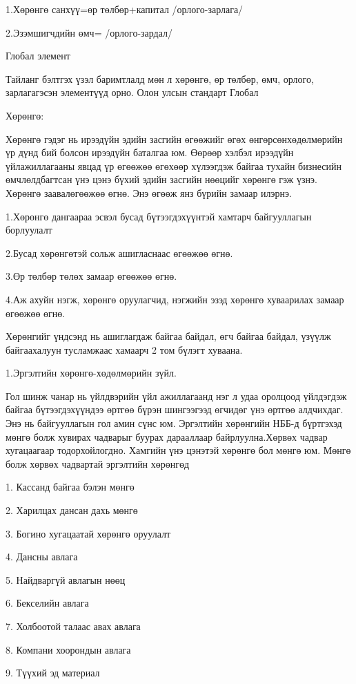 {{{{{1.Хөрөнгө санхүү=өр төлбөр+капитал /орлого-зарлага/

2.Эзэмшигчдийн өмч= /орлого-зардал/



Глобал элемент


Тайланг бэлтгэх үзэл баримтлалд мөн л хөрөнгө, өр төлбөр, өмч, орлого, зарлагагэсэн элементүүд орно. Олон улсын стандарт Глобал

Хөрөнгө:


Хөрөнгө гэдэг нь ирээдүйн эдийн засгийн өгөөжийг өгөх өнгөрсөнхөдөлмөрийн үр дүнд бий болсон ирээдүйн баталгаа юм. Өөрөөр хэлбэл ирээдүйн үйлажиллагааны явцад үр өгөөжөө өгөхөөр хүлээгдэж байгаа тухайн бизнесийн өмчлөлдбагтсан үнэ цэнэ бүхий эдийн засгийн нөөцийг хөрөнгө гэж үзнэ. Хөрөнгө заавалөгөөжөө өгнө. Энэ өгөөж янз бүрийн замаар илэрнэ.

1.Хөрөнгө дангаараа эсвэл бусад бүтээгдэхүүнтэй хамтарч байгууллагын борлуулалт

2.Бусад хөрөнгөтэй сольж ашигласнаас өгөөжөө өгнө.

3.Өр төлбөр төлөх замаар өгөөжөө өгнө.

4.Аж ахуйн нэгж, хөрөнгө оруулагчид, нэгжийн эзэд хөрөнгө хуваарилах замаар өгөөжөө өгнө.

Хөрөнгийг үндсэнд нь ашиглагдаж байгаа байдал, өгч байгаа байдал, үзүүлж байгаахалуун тусламжаас хамаарч 2 том бүлэгт хуваана.

1.Эргэлтийн хөрөнгө-хөдөлмөрийн зүйл.

Гол шинж чанар нь үйлдвэрийн үйл ажиллагаанд нэг л удаа оролцоод үйлдэгдэж байгаа бүтээгдэхүүндээ өртгөө бүрэн шингээгээд өгчидөг үнэ өртгөө алдчихдаг. Энэ нь байгууллагын гол амин сүнс юм. Эргэлтийн хөрөнгийн НББ-д бүртгэхэд мөнгө болж хувирах чадварыг буурах дарааллаар байрлуулна.Хөрвөх чадвар хугацаагаар тодорхойлогдно. Хамгийн үнэ цэнэтэй хөрөнгө бол мөнгө юм. Мөнгө болж хөрвөх чадвартай эргэлтийн хөрөнгөд

1. Кассанд байгаа бэлэн мөнгө

2. Харилцах дансан дахь мөнгө

3. Богино хугацаатай хөрөнгө оруулалт

4. Дансны авлага

5. Найдваргүй авлагын нөөц

6. Бекселийн авлага

7. Холбоотой талаас авах авлага


8. Компани хоорондын авлага

9. Түүхий эд материал

}}}}}
